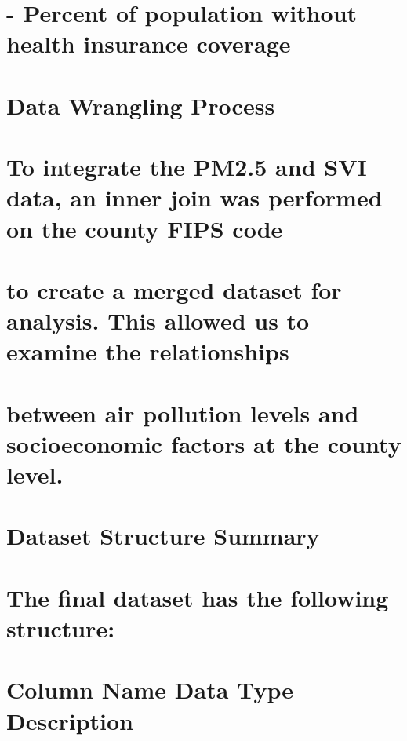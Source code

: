 \documentclass[
]{article}
\begin{document}
\section{- Percent of population without health insurance
coverage}\label{percent-of-population-without-health-insurance-coverage}

\section{Data Wrangling Process}\label{data-wrangling-process}

\section{To integrate the PM2.5 and SVI data, an inner join was
performed on the county FIPS
code}\label{to-integrate-the-pm2.5-and-svi-data-an-inner-join-was-performed-on-the-county-fips-code}

\section{to create a merged dataset for analysis. This allowed us to
examine the
relationships}\label{to-create-a-merged-dataset-for-analysis.-this-allowed-us-to-examine-the-relationships}

\section{between air pollution levels and socioeconomic factors at the
county
level.}\label{between-air-pollution-levels-and-socioeconomic-factors-at-the-county-level.}

\section{Dataset Structure Summary}\label{dataset-structure-summary}

\section{The final dataset has the following
structure:}\label{the-final-dataset-has-the-following-structure}

\section{\textbar{} Column Name \textbar{} Data Type \textbar{}
Description \textbar{}}\label{column-name-data-type-description}
\end{document}
